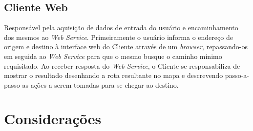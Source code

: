 \subsection{Cliente Web}
Responsável pela aquisição de dados de entrada do usuário e encaminhamento dos mesmos ao \emph{Web Service}.
Primeiramente o usuário informa o endereço de origem e destino à interface web do Cliente através de um \emph{browser}, repassando-os em seguida ao \emph{Web Service} para que o mesmo busque o caminho mínimo requisitado.
Ao receber resposta do \emph{Web Service}, o Cliente se responsabiliza de mostrar o resultado desenhando a rota resultante no mapa e descrevendo passo-a-passo as ações a serem tomadas para se chegar ao destino.

\section{Considerações}
